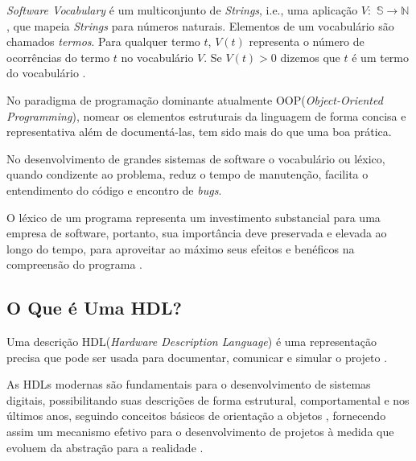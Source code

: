 \documentclass[12pt, twocolumn, a4paper]{article}
\begin{document}
 \textit{Software Vocabulary} é um multiconjunto de \textit{Strings}, i.e., uma aplicação $V:$ $\mathbb{S}\rightarrow\mathbb{N}$, que mapeia \textit{Strings} para números naturais. Elementos de um vocabulário são chamados \textit{termos}. Para qualquer termo $t$, $V(t)$ representa o número de ocorrências do termo $t$ no vocabulário $V$. Se $V(t)>0$ dizemos que $t$ é um termo do vocabulário \cite{Santos2015}.


No paradigma de programação dominante atualmente OOP(\textit{Object-Oriented Programming}), nomear os elementos estruturais da linguagem de forma concisa e representativa além de documentá-las, tem sido mais do que uma boa prática.

 No desenvolvimento de grandes sistemas de software o vocabulário ou léxico, quando condizente ao problema, reduz o tempo de manutenção, facilita o entendimento do código e encontro de \textit{bugs}.

O léxico de um programa representa um investimento substancial para uma empresa de software, portanto, sua importância deve preservada e elevada ao longo do tempo, para aproveitar ao máximo seus efeitos e benéficos na compreensão do programa \cite{Antoniol2007}.

	\subsection{O Que é Uma HDL?}

\quad Uma descrição HDL(\textit{Hardware Description Language}) é uma representação precisa que pode ser usada para documentar, comunicar e simular o projeto \cite{Miller-Karlow}.

As HDLs modernas são fundamentais para o desenvolvimento de sistemas digitais, possibilitando suas descrições de forma estrutural, comportamental e nos últimos anos, seguindo conceitos básicos de orientação a objetos \cite{Hahanov2008}, fornecendo assim um mecanismo efetivo para o desenvolvimento de projetos à medida que evoluem da abstração para a realidade \cite{Navabi2015}.
\end{document}
